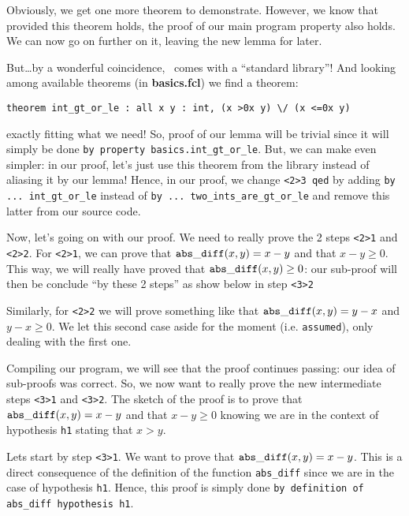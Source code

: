 \documentclass[11pt,a4paper,twoside,onecolumn,fullpage]{article}
\begin{document}
Obviously, we get one more theorem to demonstrate. However, we know
that provided this theorem holds, the proof of our main program
property also holds. We can now go on further on it, leaving the new
lemma for later.

But\ldots by a wonderful coincidence, \focal\ comes with a ``standard
library''! And looking among available theorems (in
\textbf{basics.fcl}) we find a theorem:

{\scriptsize
\begin{lstlisting}
theorem int_gt_or_le : all x y : int, (x >0x y) \/ (x <=0x y)
\end{lstlisting}}

\noindent exactly fitting what we need! So, proof of our lemma will be
trivial since it will simply be done \lstinline"by property basics.int_gt_or_le".
But, we can make even simpler: in our proof, let's just use this
theorem from the library instead of aliasing it by our lemma! Hence,
in our proof, we change \lstinline"<2>3 qed" by adding
\lstinline"by ... int_gt_or_le" instead of 
\lstinline"by ... two_ints_are_gt_or_le" and remove this latter from
our source code.

\medskip
Now, let's going on with our proof. We need to really prove the 2
steps \lstinline"<2>1" and \lstinline"<2>2". For \lstinline"<2>1", we
can prove that ${\tt abs\_diff} (x, y) = x - y$ and that
$x - y \ge 0$. This way, we will really have proved that
${\tt abs\_diff} (x, y) \ge 0$: our sub-proof will then be conclude ``by
these 2 steps'' as show below in step \lstinline"<3>2"

Similarly, for \lstinline"<2>2" we will prove something like that
${\tt abs\_diff} (x, y) = y - x$ and $y - x \ge 0$. We let this second case
aside for the moment (i.e. \lstinline"assumed"), only dealing with the
first one.

{\scriptsize
}

Compiling our program, we will see that the proof continues passing:
our idea of sub-proofs was correct. So, we now want to really prove
the new intermediate steps \lstinline"<3>1" and \lstinline"<3>2". The
sketch of the proof is to prove that ${\tt abs\_diff} (x, y) = x - y$ and
that $x - y \ge 0$ knowing we are in the context of hypothesis
\lstinline"h1" stating that $x > y$.

Lets start by step \lstinline"<3>1". We want to prove that
${\tt abs\_diff} (x, y) = x - y$.
This is a direct consequence of the definition of the function
\lstinline"abs_diff" since we are in the case of hypothesis
\lstinline"h1". Hence, this proof is simply done
\lstinline"by definition of abs_diff hypothesis h1".
\end{document}
